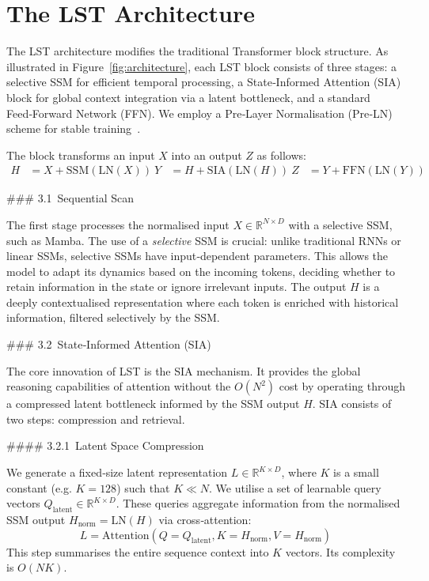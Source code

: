 \documentclass[10pt,twocolumn,letterpaper]{article}
\begin{document}
\section{The LST Architecture}

The LST architecture modifies the traditional Transformer block structure.  As illustrated in Figure \ref{fig:architecture}, each LST block consists of three stages: a selective SSM for efficient temporal processing, a State‑Informed Attention (SIA) block for global context integration via a latent bottleneck, and a standard Feed‑Forward Network (FFN).  We employ a Pre‑Layer Normalisation (Pre‑LN) scheme for stable training \cite{xiong2020layer}.

The block transforms an input $X$ into an output $Z$ as follows:
\begin{align}
H &= X + \mathrm{SSM}(\mathrm{LN}(X)) \label{eq:ssm_pass}\
Y &= H + \mathrm{SIA}(\mathrm{LN}(H)) \label{eq:sia_pass}\
Z &= Y + \mathrm{FFN}(\mathrm{LN}(Y)) \label{eq:ffn_pass}
\end{align}

### 3.1 Sequential Scan

The first stage processes the normalised input $X\in\mathbb{R}^{N\times D}$ with a selective SSM, such as Mamba.  The use of a \emph{selective} SSM is crucial: unlike traditional RNNs or linear SSMs, selective SSMs have input‑dependent parameters.  This allows the model to adapt its dynamics based on the incoming tokens, deciding whether to retain information in the state or ignore irrelevant inputs.  The output $H$ is a deeply contextualised representation where each token is enriched with historical information, filtered selectively by the SSM.

### 3.2 State‑Informed Attention (SIA)

The core innovation of LST is the SIA mechanism.  It provides the global reasoning capabilities of attention without the $O(N^2)$ cost by operating through a compressed latent bottleneck informed by the SSM output $H$.  SIA consists of two steps: compression and retrieval.

#### 3.2.1 Latent Space Compression

We generate a fixed‑size latent representation $L\in\mathbb{R}^{K\times D}$, where $K$ is a small constant (e.g. $K=128$) such that $K\ll N$.  We utilise a set of learnable query vectors $Q_{\text{latent}}\in\mathbb{R}^{K\times D}$.  These queries aggregate information from the normalised SSM output $H_{\text{norm}} = \mathrm{LN}(H)$ via cross‑attention:
\begin{equation}
L = \mathrm{Attention}(Q=Q_{\text{latent}}, K=H_{\text{norm}}, V=H_{\text{norm}})
\end{equation}
This step summarises the entire sequence context into $K$ vectors.  Its complexity is $O(NK)$.
\end{document}
